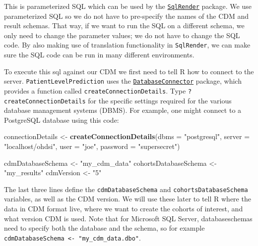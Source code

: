 \documentclass[]{article}
\newenvironment{Shaded}{\begin{snugshade}}{\end{snugshade}}
\newcommand{\KeywordTok}[1]{\textcolor[rgb]{0.13,0.29,0.53}{\textbf{#1}}}
\newcommand{\DataTypeTok}[1]{\textcolor[rgb]{0.13,0.29,0.53}{#1}}
\newcommand{\StringTok}[1]{\textcolor[rgb]{0.31,0.60,0.02}{#1}}
\newcommand{\NormalTok}[1]{#1}
\begin{document}
This is parameterized SQL which can be used by the
\href{http://github.com/OHDSI/SqlRender}{\texttt{SqlRender}} package. We
use parameterized SQL so we do not have to pre-specify the names of the
CDM and result schemas. That way, if we want to run the SQL on a
different schema, we only need to change the parameter values; we do not
have to change the SQL code. By also making use of translation
functionality in \texttt{SqlRender}, we can make sure the SQL code can
be run in many different environments.

To execute this sql against our CDM we first need to tell R how to
connect to the server. \texttt{PatientLevelPrediction} uses the
\href{http://github.com/ohdsi/DatabaseConnector}{\texttt{DatabaseConnector}}
package, which provides a function called
\texttt{createConnectionDetails}. Type \texttt{?createConnectionDetails}
for the specific settings required for the various database management
systems (DBMS). For example, one might connect to a PostgreSQL database
using this code:

\begin{Shaded}
\begin{Highlighting}[]
\NormalTok{connectionDetails <-}\StringTok{ }\KeywordTok{createConnectionDetails}\NormalTok{(}\DataTypeTok{dbms =} \StringTok{"postgresql"}\NormalTok{, }
                                             \DataTypeTok{server =} \StringTok{"localhost/ohdsi"}\NormalTok{, }
                                             \DataTypeTok{user =} \StringTok{"joe"}\NormalTok{, }
                                             \DataTypeTok{password =} \StringTok{"supersecret"}\NormalTok{)}

\NormalTok{cdmDatabaseSchema <-}\StringTok{ "my_cdm_data"}
\NormalTok{cohortsDatabaseSchema <-}\StringTok{ "my_results"}
\NormalTok{cdmVersion <-}\StringTok{ "5"}
\end{Highlighting}
\end{Shaded}

The last three lines define the \texttt{cdmDatabaseSchema} and
\texttt{cohortsDatabaseSchema} variables, as well as the CDM version. We
will use these later to tell R where the data in CDM format live, where
we want to create the cohorts of interest, and what version CDM is used.
Note that for Microsoft SQL Server, databaseschemas need to specify both
the database and the schema, so for example
\texttt{cdmDatabaseSchema\ \textless{}-\ "my\_cdm\_data.dbo"}.
\end{document}

